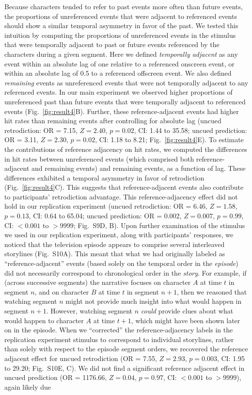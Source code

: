 \documentclass[10pt]{article}
\newcommand{\refAdjacent}{S9}
\newcommand{\refAdjacentCorrected}{S10}
\begin{document}
Because characters tended to refer to past events more often than future events, the proportions of unreferenced events that were adjacent to referenced events should show a similar temporal asymmetry in favor of the past. We tested this intuition by computing the proportions of unreferenced events in the stimulus that were temporally adjacent to past or future events referenced by the characters during a given segment. Here we defined \textit{temporally adjacent} as any event within an absolute lag of one relative to a referenced onscreen event, or within an absolute lag of 0.5 to a referenced offscreen event. We also defined \textit{remaining} events as unreferenced events that were not temporally adjacent to any referenced events. In our main experiment we observed higher proportions of unreferenced past than future events that were temporally adjacent to referenced events (Fig.~\ref{fig:result4}B). Further, these reference-adjacent events had higher hit rates than remaining events after controlling for absolute lag (uncued retrodiction: OR = 7.15, $Z = 2.40$, $p = 0.02$, CI: 1.44 to 35.58; uncued prediction: OR = 3.11, $Z = 2.30$, $p = 0.02$, CI: 1.18 to 8.21; Fig.~\ref{fig:result4}E). To estimate the contributions of reference adjacency on hit rates, we computed the differences in hit rates between unreferenced events (which comprised both reference-adjacent and remaining events) and remaining events, as a function of lag. These differences exhibited a temporal asymmetry in favor of retrodiction (Fig.~\ref{fig:result4}C). This suggests that reference-adjacent events also contribute to participants' retrodiction advantage.  This reference-adjacency effect did not hold in our replication experiment (uncued retrodiction: OR = 6.46, $Z = 1.58$, $p = 0.13$, CI: 0.64 to 65.04; uncued prediction: OR = 0.002, $Z = 0.007$, $p = 0.99$, CI: $<0.001$ to $>9999$; Fig.~\refAdjacent D, B). Upon further examination of the stimulus we used in our replication experiment, along with participants' responses, we noticed that the television episode appears to comprise several interleaved storylines (Fig.~\refAdjacentCorrected A).  This meant that what we had originally labeled as ``reference-adjacent'' events (based solely on the temporal order in the \textit{episode}) did not necessarily correspond to chronological order in the \textit{story}.  For example, if (across successive segments) the narrative focuses on character $A$ at time $t$ in segment $n$, and on character $B$ at time $t$ in segment $n + 1$, then we reasoned that watching segment $n$ might not provide much insight into what would happen in segment $n + 1$.  However, watching segment $n$ \textit{could} provide clues about what would happen to character $A$ at time $t + 1$, which might have been shown later on in the episode.  When we ``corrected'' the reference-adjacency labels in the replication experiment stimulus to correspond to individual storylines, rather than solely with respect to the episode segment orders, we recovered the reference adjacent effect for uncued retrodiction (OR = 7.55, $Z = 2.93$, $p = 0.003$, CI: 1.95 to 29.20; Fig.~\refAdjacentCorrected E, C). We did not find a significant reference adjacent effect in uncued prediction (OR = 1176.66, $Z = 0.04$, $p = 0.97$, CI: $<0.001$ to $>9999$), again likely due 
\end{document}
